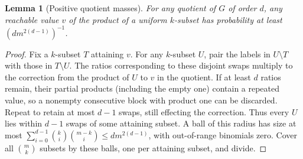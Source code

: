 \documentclass[11pt]{article}
\newtheorem{lemma}[theorem]{Lemma}
\theoremstyle{remark}\newtheorem{remark}[theorem]{Remark}
\begin{document}
\begin{lemma}[Positive quotient masses]\label{lem:mass}
For any quotient of $G$ of order $d$, any reachable value $v$ of the product of a uniform $k$-subset has probability at least $(d m^{2(d-1)})^{-1}$.
\end{lemma}
\begin{proof}
Fix a $k$-subset $T$ attaining $v$. For any $k$-subset $U$, pair the labels in $U\setminus T$ with those in $T\setminus U$. The ratios corresponding to these disjoint swaps multiply to the correction from the product of $U$ to $v$ in the quotient. If at least $d$ ratios remain, their partial products (including the empty one) contain a repeated value, so a nonempty consecutive block with product one can be discarded. Repeat to retain at most $d-1$ swaps, still effecting the correction. Thus every $U$ lies within $d-1$ swaps of some attaining subset. A ball of this radius has size at most $\sum_{i=0}^{d-1}\binom ki\binom{m-k}i\le d m^{2(d-1)}$, with out-of-range binomials zero. Cover all $\binom mk$ subsets by these balls, one per attaining subset, and divide.
\end{proof}
\end{document}
